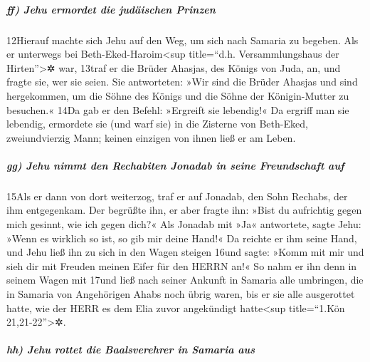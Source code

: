 \hypertarget{ff-jehu-ermordet-die-juduxe4ischen-prinzen}{%
\subparagraph{ff) Jehu ermordet die judäischen
Prinzen}\label{ff-jehu-ermordet-die-juduxe4ischen-prinzen}}

12Hierauf machte sich Jehu auf den Weg, um sich nach Samaria zu begeben.
Als er unterwegs bei Beth-Eked-Haroim\textless sup title=``d.h.
Versammlungshaus der Hirten''\textgreater✲ war, 13traf er die Brüder
Ahasjas, des Königs von Juda, an, und fragte sie, wer sie seien. Sie
antworteten: »Wir sind die Brüder Ahasjas und sind hergekommen, um die
Söhne des Königs und die Söhne der Königin-Mutter zu besuchen.« 14Da gab
er den Befehl: »Ergreift sie lebendig!« Da ergriff man sie lebendig,
ermordete sie (und warf sie) in die Zisterne von Beth-Eked,
zweiundvierzig Mann; keinen einzigen von ihnen ließ er am Leben.

\hypertarget{gg-jehu-nimmt-den-rechabiten-jonadab-in-seine-freundschaft-auf}{%
\subparagraph{gg) Jehu nimmt den Rechabiten Jonadab in seine
Freundschaft
auf}\label{gg-jehu-nimmt-den-rechabiten-jonadab-in-seine-freundschaft-auf}}

15Als er dann von dort weiterzog, traf er auf Jonadab, den Sohn Rechabs,
der ihm entgegenkam. Der begrüßte ihn, er aber fragte ihn: »Bist du
aufrichtig gegen mich gesinnt, wie ich gegen dich?« Als Jonadab mit »Ja«
antwortete, sagte Jehu: »Wenn es wirklich so ist, so gib mir deine
Hand!« Da reichte er ihm seine Hand, und Jehu ließ ihn zu sich in den
Wagen steigen 16und sagte: »Komm mit mir und sieh dir mit Freuden meinen
Eifer für den HERRN an!« So nahm er ihn denn in seinem Wagen mit 17und
ließ nach seiner Ankunft in Samaria alle umbringen, die in Samaria von
Angehörigen Ahabs noch übrig waren, bis er sie alle ausgerottet hatte,
wie der HERR es dem Elia zuvor angekündigt hatte\textless sup
title=``1.Kön 21,21-22''\textgreater✲.

\hypertarget{hh-jehu-rottet-die-baalsverehrer-in-samaria-aus}{%
\subparagraph{hh) Jehu rottet die Baalsverehrer in Samaria
aus}\label{hh-jehu-rottet-die-baalsverehrer-in-samaria-aus}}


